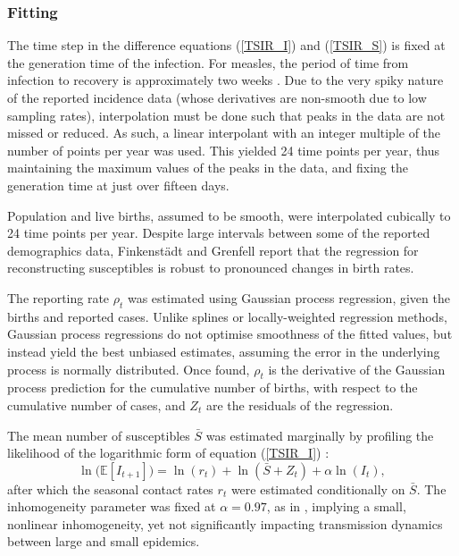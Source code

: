 \documentclass[10pt]{article}
\begin{document}
\subsubsection*{Fitting}

The time step in the difference equations (\ref{TSIR_I}) and (\ref{TSIR_S}) is fixed at the generation time of the infection. For measles, the period of time from infection to recovery is approximately two weeks \cite{Anderson1991}. Due to the very spiky nature of the reported incidence data (whose derivatives are non-smooth due to low sampling rates), interpolation must be done such that peaks in the data are not missed or reduced. As such, a linear interpolant with an integer multiple of the number of points per year was used. This yielded 24 time points per year, thus maintaining the maximum values of the peaks in the data, and fixing the generation time at just over fifteen days.

Population and live births, assumed to be smooth, were interpolated cubically to 24 time points per year. Despite large intervals between some of the reported demographics data, Finkenst\"{a}dt and Grenfell \cite{Finkenstadt2000} report that the regression for reconstructing susceptibles is robust to pronounced changes in birth rates.

The reporting rate $\rho_t$ was estimated using Gaussian process regression, given the births and reported cases. Unlike splines or locally-weighted regression methods, Gaussian process regressions do not optimise smoothness of the fitted values, but instead yield the best unbiased estimates, assuming the error in the underlying process is normally distributed. Once found, $\rho_t$ is the derivative of the Gaussian process prediction for the cumulative number of births, with respect to the cumulative number of cases, and $Z_t$ are the residuals of the regression.

The mean number of susceptibles $\bar{S}$ was estimated marginally by profiling the likelihood of the logarithmic form of equation (\ref{TSIR_I}) :
\begin{equation}
\ln\big(\mathbb{E}\left[I_{t+1}\right]\big) = \ln(r_t) + \ln\left(\bar{S} + Z_t\right) + \alpha \ln\left(I_t\right),
\end{equation}
after which the seasonal contact rates $r_t$ were estimated conditionally on $\bar{S}$. The inhomogeneity parameter was fixed at $\alpha = 0.97$, as in \cite{Metcalf2010}, implying a small, nonlinear inhomogeneity, yet not significantly impacting transmission dynamics between large and small epidemics.
\end{document}
